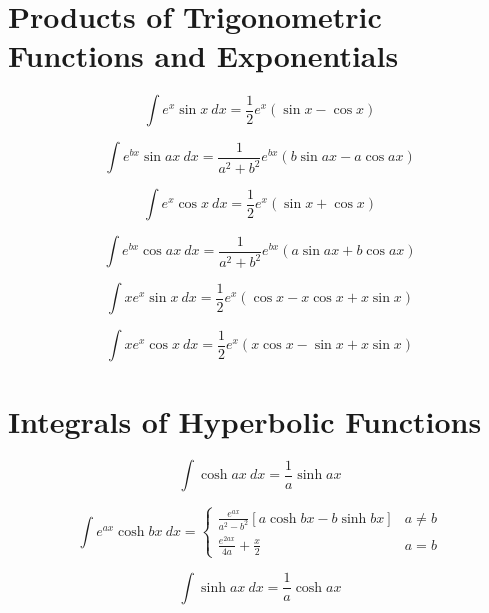 \section*{Products of Trigonometric Functions and Exponentials}

\begin{equation}
\int e^x \sin x \ dx = \frac{1}{2}e^x (\sin x - \cos x) 
\end{equation}

\begin{equation}\label{eq:ritzert}
\int e^{bx} \sin ax\ dx = \frac{1}{a^2+b^2}e^{bx} (b\sin ax - a\cos ax) 
\end{equation}

\begin{equation}
\int e^x \cos x\ dx = \frac{1}{2}e^x (\sin x + \cos x)  
\end{equation}

\begin{equation}
\int e^{bx} \cos ax\ dx = \frac{1}{a^2 + b^2} e^{bx} ( a \sin ax + b \cos ax ) 
\end{equation}

\begin{equation}
\int x e^x \sin x\ dx = \frac{1}{2}e^x (\cos x - x \cos x + x \sin x) 
\end{equation}

\begin{equation}
\int x e^x \cos x\ dx = \frac{1}{2}e^x (x \cos x 
- \sin x + x \sin x) 
\end{equation}

 \section*{Integrals of Hyperbolic Functions}

\begin{equation}
\int \cosh ax\ dx =\frac{1}{a} \sinh ax 
\end{equation}

\begin{equation}
\int e^{ax}  \cosh bx \ dx = 
\begin{cases}
\displaystyle{\frac{e^{ax}}{a^2-b^2} }[ a \cosh bx - b \sinh bx ]  & a\ne b \\
\displaystyle{\frac{e^{2ax}}{4a} + \frac{x}{2}}  & a = b
\end{cases}
\end{equation}

\begin{equation}
\int \sinh ax\ dx = \frac{1}{a} \cosh ax 
\end{equation}

